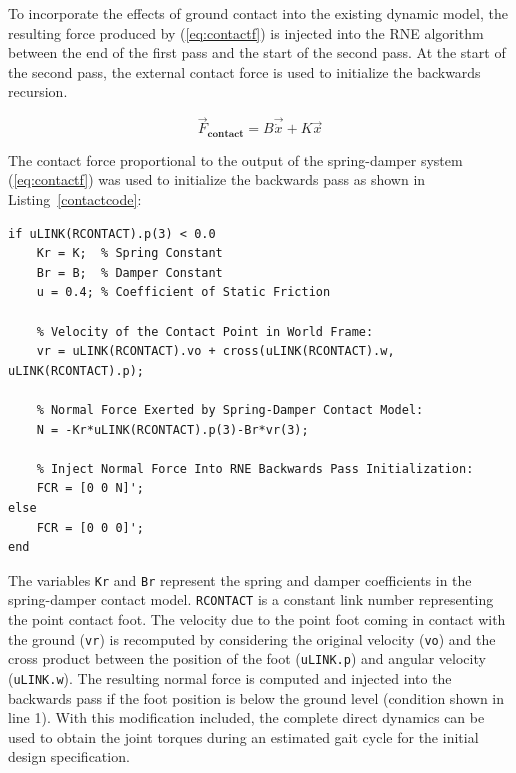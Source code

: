 To incorporate the effects of ground contact into the existing dynamic model, the resulting force produced by (\ref{eq:contactf}) is injected into the RNE algorithm between the end of the first pass and the start of the second pass. At the start of the second pass, the external contact force is used to initialize the backwards recursion. 

\begin{equation}
	\label{eq:contactf}
	\vec{F}_{\mathbf{contact}} = B\vec{\dot{x}} + K\vec{x}
\end{equation}

The contact force proportional to the output of the spring-damper system (\ref{eq:contactf}) was used to initialize the backwards pass as shown in Listing~\ref{contactcode}:

\begin{lstlisting}[label=contactcode,caption=Contact force injection in RNE backwards recursion.]
if uLINK(RCONTACT).p(3) < 0.0
	Kr = K;	 % Spring Constant
	Br = B;  % Damper Constant
	u = 0.4; % Coefficient of Static Friction
	
	% Velocity of the Contact Point in World Frame:
	vr = uLINK(RCONTACT).vo + cross(uLINK(RCONTACT).w, uLINK(RCONTACT).p); 
	
	% Normal Force Exerted by Spring-Damper Contact Model:
	N = -Kr*uLINK(RCONTACT).p(3)-Br*vr(3);
	
	% Inject Normal Force Into RNE Backwards Pass Initialization:
	FCR = [0 0 N]';
else
	FCR = [0 0 0]'; 
end
\end{lstlisting}

The variables \texttt{Kr} and \texttt{Br} represent the spring and damper coefficients in the spring-damper contact model. \texttt{RCONTACT} is a constant link number representing the point contact foot. The velocity due to the point foot coming in contact with the ground (\texttt{vr}) is recomputed by considering the original velocity (\texttt{vo}) and the cross product between the position of the foot (\texttt{uLINK.p}) and angular velocity (\texttt{uLINK.w}). The resulting normal force is computed and injected into the backwards pass if the foot position is below the ground level (condition shown in line 1). With this modification included, the complete direct dynamics can be used to obtain the joint torques during an estimated gait cycle for the initial design specification.   



